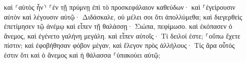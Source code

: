 \documentclass{openreader}
\begin{document}
καὶ ⸂αὐτὸς ἦν⸃ ⸀ἐν τῇ πρύμνῃ ἐπὶ τὸ προσκεφάλαιον καθεύδων· καὶ ⸀ἐγείρουσιν αὐτὸν καὶ λέγουσιν αὐτῷ· Διδάσκαλε, οὐ μέλει σοι ὅτι ἀπολλύμεθα; 
καὶ διεγερθεὶς ἐπετίμησεν τῷ ἀνέμῳ καὶ εἶπεν τῇ θαλάσσῃ· Σιώπα, πεφίμωσο. καὶ ἐκόπασεν ὁ ἄνεμος, καὶ ἐγένετο γαλήνη μεγάλη. 
καὶ εἶπεν αὐτοῖς· Τί δειλοί ἐστε; ⸀οὔπω ἔχετε πίστιν; 
καὶ ἐφοβήθησαν φόβον μέγαν, καὶ ἔλεγον πρὸς ἀλλήλους· Τίς ἄρα οὗτός ἐστιν ὅτι καὶ ὁ ἄνεμος καὶ ἡ θάλασσα ⸀ὑπακούει αὐτῷ; 
\end{document}
